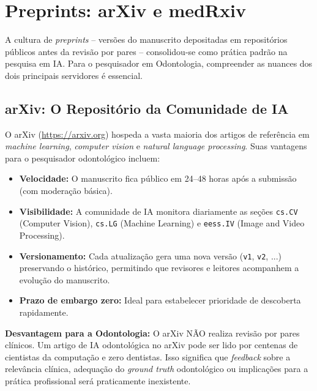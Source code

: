 \section{Preprints: arXiv e medRxiv}
\label{sec:preprints}

\nivelquatro

A cultura de \textit{preprints} -- versões do manuscrito depositadas em
repositórios públicos antes da revisão por pares -- consolidou-se como prática
padrão na pesquisa em IA. Para o pesquisador em Odontologia, compreender as
nuances dos dois principais servidores é essencial.

  

\subsection{arXiv: O Repositório da Comunidade de IA}

O arXiv (\url{https://arxiv.org}) hospeda a vasta maioria dos artigos de
referência em \textit{machine learning}, \textit{computer vision} e
\textit{natural language processing}. Suas vantagens para o pesquisador
odontológico incluem:

\begin{itemize}
  \item \textbf{Velocidade:} O manuscrito fica público em 24--48 horas após a
    submissão (com moderação básica).
  \item \textbf{Visibilidade:} A comunidade de IA monitora diariamente as seções
    \texttt{cs.CV} (Computer Vision), \texttt{cs.LG} (Machine Learning) e
    \texttt{eess.IV} (Image and Video Processing).
  \item \textbf{Versionamento:} Cada atualização gera uma nova versão
    (\texttt{v1}, \texttt{v2}, ...) preservando o histórico, permitindo que
    revisores e leitores acompanhem a evolução do manuscrito.
  \item \textbf{Prazo de embargo zero:} Ideal para estabelecer prioridade de
    descoberta rapidamente.
\end{itemize}

\textbf{Desvantagem para a Odontologia:} O arXiv NÃO realiza revisão por pares
clínicos. Um artigo de IA odontológica no arXiv pode ser lido por centenas de
cientistas da computação e zero dentistas. Isso significa que \textit{feedback}
sobre a relevância clínica, adequação do \textit{ground truth} odontológico ou
implicações para a prática profissional será praticamente inexistente.


